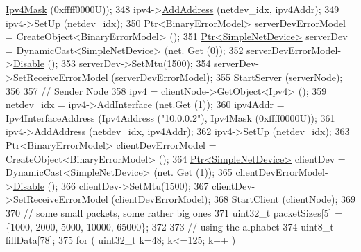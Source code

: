 \begin{DoxyCode}
      \hyperlink{classns3_1_1Ipv4Mask}{Ipv4Mask} (0xffff0000U));
348   ipv4->\hyperlink{classns3_1_1Ipv4_ad203526cae6a4b86f1bb89e44d2b62f7}{AddAddress} (netdev\_idx, ipv4Addr);
349   ipv4->\hyperlink{classns3_1_1Ipv4_a71b2f8acca4923aef907b50b3196bf23}{SetUp} (netdev\_idx);
350   \hyperlink{classns3_1_1Ptr}{Ptr<BinaryErrorModel>} serverDevErrorModel = CreateObject<BinaryErrorModel> ();
351   \hyperlink{classns3_1_1Ptr}{Ptr<SimpleNetDevice>} serverDev = DynamicCast<SimpleNetDevice> (net.
      \hyperlink{classns3_1_1NetDeviceContainer_a677d62594b5c9d2dea155cc5045f4d0b}{Get} (0));
352   serverDevErrorModel->\hyperlink{classns3_1_1ErrorModel_a55d35a3e713c31f650577e9f96cf25c0}{Disable} ();
353   serverDev->SetMtu(1500);
354   serverDev->SetReceiveErrorModel (serverDevErrorModel);
355   \hyperlink{classIpv4FragmentationTest_a854c6040ada33b3c61c03b459d1a1d72}{StartServer} (serverNode);
356 
357   \textcolor{comment}{// Sender Node}
358   ipv4 = clientNode->\hyperlink{classns3_1_1Object_a13e18c00017096c8381eb651d5bd0783}{GetObject}<\hyperlink{classns3_1_1Ipv4}{Ipv4}> ();
359   netdev\_idx = ipv4->\hyperlink{classns3_1_1Ipv4_a637354128b71bc587ea5a6eeaef42469}{AddInterface} (net.\hyperlink{classns3_1_1NetDeviceContainer_a677d62594b5c9d2dea155cc5045f4d0b}{Get} (1));
360   ipv4Addr = \hyperlink{classns3_1_1Ipv4InterfaceAddress}{Ipv4InterfaceAddress} (\hyperlink{classns3_1_1Ipv4Address}{Ipv4Address} (\textcolor{stringliteral}{"10.0.0.2"}), 
      \hyperlink{classns3_1_1Ipv4Mask}{Ipv4Mask} (0xffff0000U));
361   ipv4->\hyperlink{classns3_1_1Ipv4_ad203526cae6a4b86f1bb89e44d2b62f7}{AddAddress} (netdev\_idx, ipv4Addr);
362   ipv4->\hyperlink{classns3_1_1Ipv4_a71b2f8acca4923aef907b50b3196bf23}{SetUp} (netdev\_idx);
363   \hyperlink{classns3_1_1Ptr}{Ptr<BinaryErrorModel>} clientDevErrorModel = CreateObject<BinaryErrorModel> ();
364   \hyperlink{classns3_1_1Ptr}{Ptr<SimpleNetDevice>} clientDev = DynamicCast<SimpleNetDevice> (net.
      \hyperlink{classns3_1_1NetDeviceContainer_a677d62594b5c9d2dea155cc5045f4d0b}{Get} (1));
365   clientDevErrorModel->\hyperlink{classns3_1_1ErrorModel_a55d35a3e713c31f650577e9f96cf25c0}{Disable} ();
366   clientDev->SetMtu(1500);
367   clientDev->SetReceiveErrorModel (clientDevErrorModel);
368   \hyperlink{classIpv4FragmentationTest_a5ce3759e72c31d2f86d6424ff0702b47}{StartClient} (clientNode);
369 
370   \textcolor{comment}{// some small packets, some rather big ones}
371   uint32\_t packetSizes[5] = \{1000, 2000, 5000, 10000, 65000\};
372 
373   \textcolor{comment}{// using the alphabet}
374   uint8\_t fillData[78];
375   \textcolor{keywordflow}{for} ( uint32\_t k=48; k<=125; k++ )

\end{DoxyCode}
